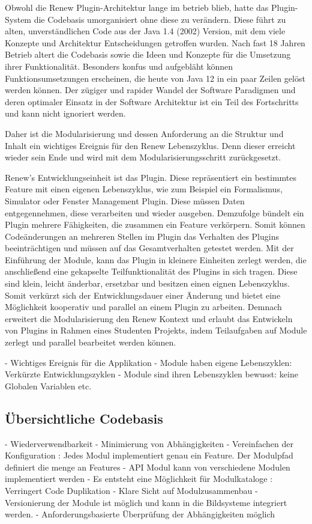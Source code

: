 Obwohl die Renew Plugin-Architektur lange im betrieb blieb, hatte das Plugin-System die Codebasis umorganisiert ohne diese zu verändern. Diese führt zu alten, unverständlichen Code aus der Java 1.4 (2002) Version, mit dem viele Konzepte und Architektur Entscheidungen getroffen wurden. Nach fast 18 Jahren Betrieb altert die Codebasis sowie die Ideen und Konzepte für die Umsetzung ihrer Funktionalität. Besonders konfus und aufgebläht können Funktionsumsetzungen erscheinen, die heute von Java 12 in ein paar Zeilen gelöst werden können. Der zügiger und rapider Wandel der Software Paradigmen und deren optimaler Einsatz in der Software Architektur ist ein Teil des Fortschritts und kann nicht ignoriert werden. 


Daher ist die Modularisierung und dessen Anforderung an die Struktur und Inhalt ein wichtiges Ereignis für den Renew Lebenszyklus. Denn dieser erreicht wieder sein Ende und wird mit dem Modularisierungsschritt zurückgesetzt. \bigbreak



Renew's Entwicklungseinheit ist das Plugin. Diese repräsentiert ein bestimmtes Feature mit einen eigenen Lebenszyklus, wie zum Beispiel ein Formalismus, Simulator oder Fenster Management Plugin. Diese müssen Daten entgegennehmen, diese verarbeiten und wieder ausgeben. Demzufolge bündelt ein Plugin mehrere Fähigkeiten, die zusammen ein Feature verkörpern. Somit können Codeänderungen an mehreren Stellen im Plugin das Verhalten des Plugins beeinträchtigen und müssen auf das Gesamtverhalten getestet werden. Mit der Einführung der Module, kann das Plugin in kleinere Einheiten zerlegt werden, die anschließend eine gekapselte Teilfunktionalität des Plugins in sich tragen. Diese sind klein, leicht änderbar, ersetzbar und besitzen einen eignen Lebenszyklus. Somit verkürzt sich der Entwicklungsdauer einer Änderung und bietet eine Möglichkeit kooperativ und parallel an einem Plugin zu arbeiten. Demnach erweitert die Modularisierung den Renew Kontext und erlaubt das Entwickeln von Plugins in Rahmen eines Studenten Projekts, indem Teilaufgaben auf Module zerlegt und parallel bearbeitet werden können. 


 \newpage

	- Wichtiges Ereignis für die Applikation
	- Module haben eigene Lebenszyklen: Verkürzte Entwicklungszyklen  
	- Module sind ihren Lebenszyklen bewusst: keine Globalen Variablen etc.

\subsection{Übersichtliche Codebasis}\label{sub:übersichtliche_codebasis}
	- Wiederverwendbarkeit 
	- Minimierung von Abhängigkeiten 
	- Vereinfachen der Konfiguration : Jedes Modul implementiert genau ein Feature. Der Modulpfad definiert die menge an Features 
	- API Modul kann von verschiedene Modulen implementiert werden
	- Es entsteht eine Möglichkeit für Modulkataloge : Verringert Code Duplikation
	- Klare Sicht auf Modulzusammenbau  
	- Versionierung der Module ist möglich und kann in die Bildsysteme integriert werden. 
	- Anforderungsbasierte Überprüfung der Abhängigkeiten möglich 

